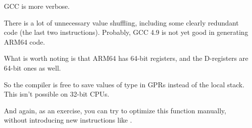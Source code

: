 


\NonOptimizing GCC is more verbose.

There is a lot of unnecessary value shuffling, including some clearly redundant code 
(the last two  instructions).  Probably, GCC 4.9 is not yet good in generating ARM64 code.

What is worth noting is that ARM64 has 64-bit registers, and the D-registers are 64-bit ones as well.

So the compiler is free to save values of type \Tdouble in \ac{GPR}s instead of the local stack.
This isn't possible on 32-bit CPUs.

And again, as an exercise, you can try to optimize this function manually, without introducing
new instructions like .
